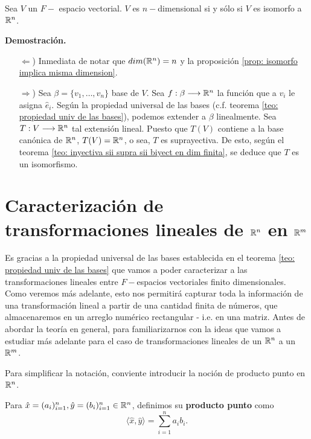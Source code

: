 \begin{prop}
	\label{prop: dim V n sii V isomorfo a Rn}
Sea $V$ un $F-$ espacio vectorial. $V$ es $n-$dimensional
si y sólo si $V$ es isomorfo a $\mathbb{R}^{n}$.
\end{prop}
\noindent
\textbf{Demostración.}
\begin{itemize}
	\item[$\Leftarrow$)] Inmediata de notar que $dim(\mathbb{R}^{n}) = n$
	y la proposición \ref{prop: isomorfo implica misma dimension}.
	\item[$\Rightarrow$)] Sea $\beta = \{ v_{1}, \ldots , v_{n} \}$
	base de $V$. Sea $f: \beta \longrightarrow \mathbb{R}^{n}$ la función
	que a $v_{i}$ le asigna $\hat{e}_{i}$. Según la propiedad 
	universal de las bases (c.f. teorema 
	\ref{teo: propiedad univ de las bases}), podemos extender
	a $\beta$ linealmente. Sea $T: V \longrightarrow \mathbb{R}^{n}$ 
	tal extensión lineal. Puesto que $T(V)$ contiene a la 
	base canónica de $\mathbb{R}^{n}$, $T(V) = \mathbb{R}^{n}$, o sea,
	$T$ es suprayectiva. De esto, según el teorema 
	\ref{teo: inyectiva sii supra sii biyect en dim finita}, se
	deduce que $T$ es un isomorfismo.
\end{itemize}
\QEDB
\vspace{0.2cm}

\section{Caracterización de transformaciones lineales de $\mathbb{R}^{n}$ en $\mathbb{R}^{m}$}
Es gracias a la propiedad universal de las bases establecida
en el teorema \ref{teo: propiedad univ de las bases}
que vamos a poder caracterizar a las transformaciones lineales
entre $F-$espacios vectoriales finito
dimensionales. Como veremos más adelante, esto nos permitirá 
capturar toda la información de una transformación lineal a partir
de una cantidad finita de números, que almacenaremos en un arreglo
numérico rectangular - i.e. en una matriz.
Antes de abordar la teoría en general, para familiarizarnos
con la ideas que vamos a estudiar más adelante 
para el caso de transformaciones lineales de un $\mathbb{R}^{n}$
a un $\mathbb{R}^{m}$.


Para simplificar la notación, conviente introducir la noción de producto
punto en $\mathbb{R}^{n}$.
\begin{defi}
Para $\hat{x} = (a_{i})_{i=1}^{n}, 
\hat{y} = (b_{i})_{i=1}^{n} \in \mathbb{R}^{n}$, definimos su \textbf{producto
punto} como
\[
\langle \hat{x}, \hat{y} \rangle = 
\sum_{i=1}^{n} a_{i} b_{i}.
\]
\end{defi}

